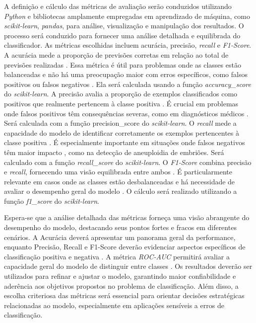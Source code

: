 A definição e cálculo das métricas de avaliação serão conduzidos utilizando \textit{Python} e bibliotecas amplamente empregadas em aprendizado de máquina, como \textit{scikit-learn}, \textit{pandas}, para análise, visualização e manipulação dos resultados. O processo será conduzido para fornecer uma análise detalhada e equilibrada do classificador. As métricas escolhidas incluem acurácia, precisão, \textit{recall} e \textit{F1-Score}. A acurácia mede a proporção de previsões corretas em relação ao total de previsões realizadas \cite{vilela2022}. Essa métrica é útil para problemas onde as classes estão balanceadas e não há uma preocupação maior com erros específicos, como falsos positivos ou falsos negativos \cite{vilela2022}. Ela será calculada usando a função \textit{accuracy\_score} do \textit{scikit-learn}. A precisão avalia a proporção de exemplos classificados como positivos que realmente pertencem à classe positiva \cite{vilela2022}. É crucial em problemas onde falsos positivos têm consequências severas, como em diagnósticos médicos \cite{vilela2022}. Será calculada com a função precision\_score do \textit{scikit-learn}. O \textit{recall} mede a capacidade do modelo de identificar corretamente os exemplos pertencentes à classe positiva \cite{vilela2022}. É especialmente importante em situações onde falsos negativos têm maior impacto \cite{vilela2022}, como na detecção de aneuploidia de embriões. Será calculado com a função \textit{recall\_score} do \textit{scikit-learn}. O \textit{F1-Score} combina precisão e \textit{recall}, fornecendo uma visão equilibrada entre ambos \cite{vilela2022}. É particularmente relevante em casos onde as classes estão desbalanceadas e há necessidade de avaliar o desempenho geral do modelo \cite{vilela2022}. O cálculo será realizado utilizando a função \textit{f1\_score} do \textit{scikit-learn}.

Espera-se que a análise detalhada das métricas forneça uma visão abrangente do desempenho do modelo, destacando seus pontos fortes e fracos em diferentes cenários. A Acurácia deverá apresentar um panorama geral da performance, enquanto Precisão, Recall e F1-Score deverão evidenciar aspectos específicos de classificação positiva e negativa \cite{vilela2022}. A métrica \textit{ROC-AUC} permitirá avaliar a capacidade geral do modelo de distinguir entre classes \cite{vilela2022}. Os resultados deverão ser utilizados para refinar e ajustar o modelo, garantindo maior confiabilidade e aderência aos objetivos propostos no problema de classificação. Além disso, a escolha criteriosa das métricas será essencial para orientar decisões estratégicas relacionadas ao modelo, especialmente em aplicações sensíveis a erros de classificação.

